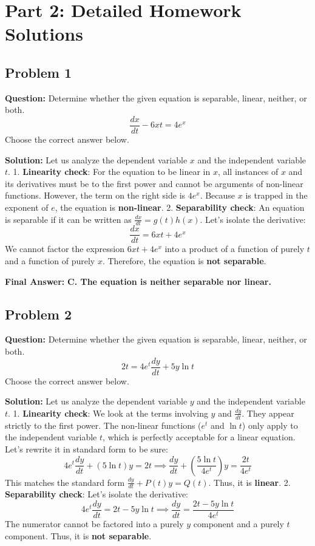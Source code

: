 \documentclass[11pt]{article}
\begin{document}
\newpage
\section{Part 2: Detailed Homework Solutions}

\subsection*{Problem 1}
\textbf{Question:} Determine whether the given equation is separable, linear, neither, or both.
\[ \frac{dx}{dt} - 6xt = 4e^x \]
Choose the correct answer below.

\textbf{Solution:}
Let us analyze the dependent variable $x$ and the independent variable $t$.
1. \textbf{Linearity check}: For the equation to be linear in $x$, all instances of $x$ and its derivatives must be to the first power and cannot be arguments of non-linear functions. However, the term on the right side is $4e^x$. Because $x$ is trapped in the exponent of $e$, the equation is \textbf{non-linear}.
2. \textbf{Separability check}: An equation is separable if it can be written as $\frac{dx}{dt} = g(t)h(x)$. Let's isolate the derivative:
\[ \frac{dx}{dt} = 6xt + 4e^x \]
We cannot factor the expression $6xt + 4e^x$ into a product of a function of purely $t$ and a function of purely $x$. Therefore, the equation is \textbf{not separable}.

\textbf{Final Answer:} \textbf{C. The equation is neither separable nor linear.}

\hrulefill

\subsection*{Problem 2}
\textbf{Question:} Determine whether the given equation is separable, linear, neither, or both.
\[ 2t = 4e^t \frac{dy}{dt} + 5y \ln t \]
Choose the correct answer below.

\textbf{Solution:}
Let us analyze the dependent variable $y$ and the independent variable $t$.
1. \textbf{Linearity check}: We look at the terms involving $y$ and $\frac{dy}{dt}$. They appear strictly to the first power. The non-linear functions ($e^t$ and $\ln t$) only apply to the independent variable $t$, which is perfectly acceptable for a linear equation. Let's rewrite it in standard form to be sure:
\[ 4e^t \frac{dy}{dt} + (5\ln t)y = 2t \implies \frac{dy}{dt} + \left( \frac{5\ln t}{4e^t} \right)y = \frac{2t}{4e^t} \]
This matches the standard form $\frac{dy}{dt} + P(t)y = Q(t)$. Thus, it is \textbf{linear}.
2. \textbf{Separability check}: Let's isolate the derivative:
\[ 4e^t \frac{dy}{dt} = 2t - 5y \ln t \implies \frac{dy}{dt} = \frac{2t - 5y \ln t}{4e^t} \]
The numerator cannot be factored into a purely $y$ component and a purely $t$ component. Thus, it is \textbf{not separable}.
\end{document}
